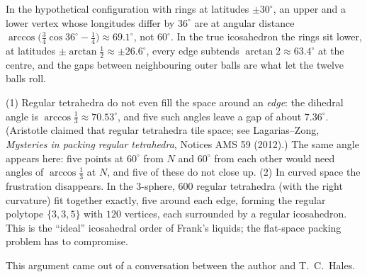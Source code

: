 \begin{remark}
In the hypothetical configuration with rings at latitudes $\pm30^\circ$, an upper and a lower vertex
whose longitudes differ by $36^\circ$ are at angular distance $\arccos\big(\tfrac34\cos36^\circ-\tfrac14\big)
\approx69.1^\circ$, not $60^\circ$. In the true icosahedron the rings sit lower, at latitudes
$\pm\arctan\frac12\approx\pm26.6^\circ$, every edge subtends $\arctan2\approx63.4^\circ$ at the centre, and
the gaps between neighbouring outer balls are what let the twelve balls roll.
\end{remark}

\begin{remark}
(1) Regular tetrahedra do not even fill the space around an \emph{edge}: the dihedral angle is
$\arccos\frac13\approx70.53^\circ$, and five such angles leave a gap of about $7.36^\circ$. (Aristotle
claimed that regular tetrahedra tile space; see Lagarias--Zong, \emph{Mysteries in packing regular
tetrahedra}, Notices AMS 59 (2012).) The same angle appears here: five points at $60^\circ$ from $N$ and
$60^\circ$ from each other would need angles of $\arccos\frac13$ at $N$, and five of these do not close up.
(2) In curved space the frustration disappears. In the $3$-sphere, $600$ regular tetrahedra (with
the right curvature) fit together exactly, five around each edge, forming the regular polytope
$\{3,3,5\}$ with $120$ vertices, each surrounded by a regular icosahedron. This is the ``ideal''
icosahedral order of Frank's liquids; the flat-space packing problem has to compromise.
\end{remark}

\begin{remark}[Source]
This argument came out of a conversation between the author and T.~C.~Hales.
\end{remark}
